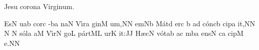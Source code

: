 
\beginhymn Jesu corona Virginum.

\Internote
\nosolesmescustos
\initiumgregorianum
{}%
\sgn {}Es\punctum N\egn
\sgn {}u{}\pes ab\egn
\spatium
\sgn cor\punctum c\egn
{}-\clivis ba\egn
\sgn na{}\punctum N\egn
\spatium
\sgn V{\'\i}r\punctum a\egn
\sgn gin\punctum M\egn
\sgn {}u{m,}\punctum N\augmentum N\egn
\spatium
\divisiominima
\spatium
{}em\pes Nb\egn
\spatium
\sgn M{\'a}t\punctum d\egn
\sgn {}er\punctum c\egn
\spatium
{}\punctum b\egn
\sgn {}a{}\punctum d\egn
\spatium
\sgn c{\'o}n\clivis cb\egn
\sgn cip\punctum a\egn
\sgn {}i{t,}\punctum N\augmentum N\egn
\spatium
\divisiominor
\spatium
\custos N
\lineaproxima
{}\punctum N\egn
\spatium
\sgn s{\'o}l\punctum a\egn
\sgn {}a{}\punctum M\egn
\spatium
\sgn V{\'\i}r\punctum N\egn
\sgn go{}\punctum L\egn
\spatium
\sgn p{\'a}{rt}\clivis ML\egn
\sgn {}ur\punctum K\egn
\sgn {}i{t:}\punctum J\augmentum J\egn
\spatium
\divisiominima
\spatium
\sgn H{\ae}c\punctum N\egn
\spatium
\sgn v{\'o}t\pes ab\egn
\sgn {}a{}\punctum c\egn
\spatium
{}m\clivis ba\egn
\sgn {}e{ns}\punctum N\egn
\spatium
{}c\punctum a\egn
\sgn cip\punctum M\egn
\sgn {}e.\punctum N\augmentum N\egn
\spatium
\Finisgregoriana


\bigskip

\beginlyrics

